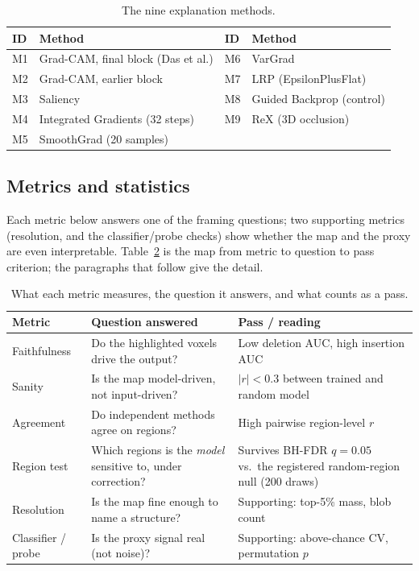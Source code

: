 \documentclass[11pt]{article}
\begin{document}
\begin{table}[H]
\centering
\caption{The nine explanation methods.}
\label{tab:methods}
\begin{tabular}{llll}
\toprule
ID & Method & ID & Method \\
\midrule
M1 & Grad-CAM, final block (Das et al.) & M6 & VarGrad \\
M2 & Grad-CAM, earlier block & M7 & LRP (EpsilonPlusFlat) \\
M3 & Saliency & M8 & Guided Backprop (control) \\
M4 & Integrated Gradients (32 steps) & M9 & ReX (3D occlusion) \\
M5 & SmoothGrad (20 samples) & & \\
\bottomrule
\end{tabular}
\end{table}

\subsection{Metrics and statistics}
\label{sec:metrics}
Each metric below answers one of the framing questions; two supporting metrics
(resolution, and the classifier/probe checks) show whether the map and the proxy are even
interpretable. Table~\ref{tab:metrics} is the map from metric to question to pass criterion;
the paragraphs that follow give the detail.

\begin{table}[H]
\centering
\caption{What each metric measures, the question it answers, and what counts as a pass.}
\label{tab:metrics}
\small
\begin{tabular}{>{\raggedright}p{2.6cm}>{\raggedright}p{4.2cm}>{\raggedright\arraybackslash}p{5.2cm}}
\toprule
Metric & Question answered & Pass / reading \\
\midrule
Faithfulness & Do the highlighted voxels drive the output? & Low deletion AUC, high insertion AUC \\
Sanity & Is the map model-driven, not input-driven? & $|r|<0.3$ between trained and random model \\
Agreement & Do independent methods agree on regions? & High pairwise region-level $r$ \\
Region test & Which regions is the \emph{model} sensitive to, under correction? & Survives BH-FDR $q=0.05$ vs.\ the registered random-region null (200 draws) \\
Resolution & Is the map fine enough to name a structure? & Supporting: top-5\% mass, blob count \\
Classifier / probe & Is the proxy signal real (not noise)? & Supporting: above-chance CV, permutation $p$ \\
\bottomrule
\end{tabular}
\end{table}
\end{document}
